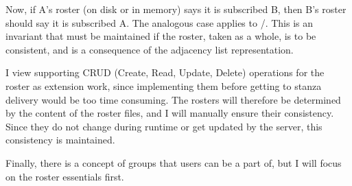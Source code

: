 Now, if A's roster (on disk or in memory) says it is subscribed  B, then B's roster should say it is subscribed  A. The analogous case applies to /. This is an invariant that must be maintained if the roster, taken as a whole, is to be consistent, and is a consequence of the adjacency list representation.

I view supporting CRUD (Create, Read, Update, Delete) operations for the roster as extension work, since implementing them before getting to stanza delivery would be too time consuming. The rosters will therefore be determined by the content of the roster files, and I will manually ensure their consistency. Since they do not change during runtime or get updated by the server, this consistency is maintained.

Finally, there is a concept of groups that users can be a part of, but I will focus on the roster essentials first.
